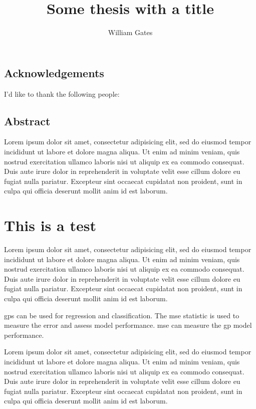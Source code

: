 \documentclass[a4paper,palatino,11pt,twoside]{thesis}
\title{Some thesis with a title}
\author{William Gates}
\begin{document}
	\startpreamble
	
	
	\section*{Acknowledgements}
	I'd like to thank the following people:
	
	\newpage
	\section*{Abstract}
	Lorem ipsum dolor sit amet, consectetur adipisicing elit, sed do eiusmod tempor incididunt ut labore et dolore magna aliqua. Ut enim ad minim veniam, quis nostrud exercitation ullamco laboris nisi ut aliquip ex ea commodo consequat. Duis aute irure dolor in reprehenderit in voluptate velit esse cillum dolore eu fugiat nulla pariatur. Excepteur sint occaecat cupidatat non proident, sunt in culpa qui officia deserunt mollit anim id est laborum.
	
	\tableofcontents
	\listoffigures
	\listoftables
	
	\printnomenclature[2cm]
	
	\stoppreamble
	
	\chapter{This is a test}
	Lorem ipsum dolor sit amet, consectetur adipisicing elit, sed do eiusmod tempor incididunt ut labore et dolore magna aliqua. Ut enim ad minim veniam, quis nostrud exercitation ullamco laboris nisi ut aliquip ex ea commodo consequat. Duis aute irure dolor in reprehenderit in voluptate velit esse cillum dolore eu fugiat nulla pariatur. Excepteur sint occaecat cupidatat non proident, sunt in culpa qui officia deserunt mollit anim id est laborum.
	
	\Glspl{gp} can be used for regression and classification. The \gls{mse} statistic is used to measure the error and assess model performance. \Gls{mse} can measure the \gls{gp} model performance.

	
	Lorem ipsum dolor sit amet, consectetur adipisicing elit, sed do eiusmod tempor incididunt ut labore et dolore magna aliqua. Ut enim ad minim veniam, quis nostrud exercitation ullamco laboris nisi ut aliquip ex ea commodo consequat. Duis aute irure dolor in reprehenderit in voluptate velit esse cillum dolore eu fugiat nulla pariatur. Excepteur sint occaecat cupidatat non proident, sunt in culpa qui officia deserunt mollit anim id est laborum.
	
\end{document}
